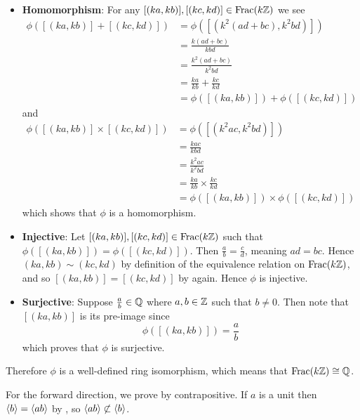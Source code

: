 \begin{questions}
\begin{partquestions}{\alph*}
\begin{itemize}
            \item \textbf{Homomorphism}: For any $[(ka, kb)], [(kc, kd)] \in \mathrm{Frac}(k\mathbb{Z})$ we see
            \begin{align*}
                \phi([(ka,kb)] + [(kc,kd)]) &= \phi([(k^2(ad+bc), k^2bd)])\\
                &= \frac{k(ad+bc)}{kbd}\\
                &= \frac{k^2(ad+bc)}{k^2bd}\\
                &= \frac {ka}{kb} + \frac {kc}{kd}\\
                &= \phi([(ka,kb)]) + \phi([(kc,kd)])
            \end{align*}
            and
            \begin{align*}
                \phi([(ka,kb)] \times [(kc,kd)]) &= \phi([(k^2ac, k^2bd)])\\
                &= \frac{kac}{kbd}\\
                &= \frac{k^2ac}{k^2bd}\\
                &= \frac {ka}{kb} \times \frac {kc}{kd}\\
                &= \phi([(ka,kb)]) \times \phi([(kc,kd)])
            \end{align*}
            which shows that $\phi$ is a homomorphism.

            \item \textbf{Injective}: Let $[(ka, kb)], [(kc, kd)] \in \mathrm{Frac}(k\mathbb{Z})$ such that $\phi([(ka, kb)]) = \phi([(kc, kd)])$. Then $\frac ab = \frac cd$, meaning $ad = bc$. Hence $(ka, kb) \mathrel{\sim} (kc, kd)$ by definition of the equivalence relation on $\mathrm{Frac}(k\mathbb{Z})$, and so $[(ka, kb)] = [(kc, kd)]$ by  again. Hence $\phi$ is injective.

            \item \textbf{Surjective}: Suppose $\frac ab \in \mathbb{Q}$ where $a, b \in \mathbb{Z}$ such that $b \neq 0$. Then note that $[(ka, kb)]$ is its pre-image since
            \[
                \phi([(ka, kb)]) = \frac ab
            \]
            which proves that $\phi$ is surjective.
        \end{itemize}
        Therefore $\phi$ is a well-defined ring isomorphism, which means that $\mathrm{Frac}(k\mathbb{Z}) \cong \mathbb{Q}$.
    \end{partquestions}

    \item For the forward direction, we prove by contrapositive. If $a$ is a unit then $\left\langle b\right\rangle = \left\langle ab\right\rangle$ by , so $\left\langle ab\right\rangle \not\subset \left\langle b\right\rangle$.


\end{questions}
